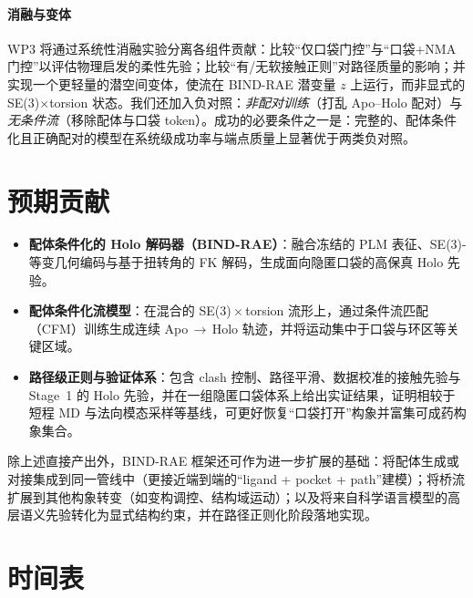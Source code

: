 \documentclass[11pt,a4paper,fontset=fandol]{ctexart}
\begin{document}
\paragraph{消融与变体}
WP3 将通过系统性消融实验分离各组件贡献：比较“仅口袋门控”与“口袋+NMA 门控”以评估物理启发的柔性先验；比较“有/无软接触正则”对路径质量的影响；并实现一个更轻量的潜空间变体，使流在 BIND-RAE 潜变量 $z$ 上运行，而非显式的 SE(3)$\times$torsion 状态。我们还加入负对照：\emph{非配对训练}（打乱 Apo--Holo 配对）与\emph{无条件流}（移除配体与口袋 token）。成功的必要条件之一是：完整的、配体条件化且正确配对的模型在系统级成功率与端点质量上显著优于两类负对照。

\section{预期贡献}

\begin{itemize}
	    \item \textbf{配体条件化的 Holo 解码器（BIND-RAE）}：融合冻结的 PLM 表征、SE(3)-等变几何编码与基于扭转角的 FK 解码，生成面向隐匿口袋的高保真 Holo 先验。
	    \item \textbf{配体条件化流模型}：在混合的 SE(3)\,$\times$\,torsion 流形上，通过条件流匹配（CFM）训练生成连续 Apo\,$\to$\,Holo 轨迹，并将运动集中于口袋与环区等关键区域。
	    \item \textbf{路径级正则与验证体系}：包含 clash 控制、路径平滑、数据校准的接触先验与 Stage~1 的 Holo 先验，并在一组隐匿口袋体系上给出实证结果，证明相较于短程 MD 与法向模态采样等基线，可更好恢复“口袋打开”构象并富集可成药构象集合。
\end{itemize}

除上述直接产出外，BIND-RAE 框架还可作为进一步扩展的基础：将配体生成或对接集成到同一管线中（更接近端到端的“ligand + pocket + path”建模）；将桥流扩展到其他构象转变（如变构调控、结构域运动）；以及将来自科学语言模型的高层语义先验转化为显式结构约束，并在路径正则化阶段落地实现。

\clearpage
\section*{时间表}
\end{document}
